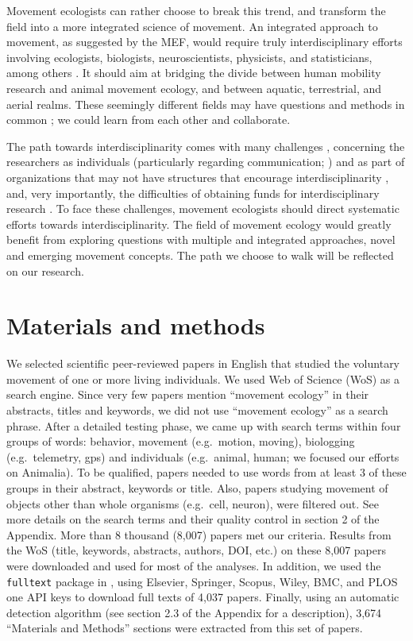 \documentclass[a4paper,12pt]{article}
\begin{document}
Movement ecologists can rather choose to break this trend, and transform
the field into a more integrated science of movement. An integrated
approach to movement, as suggested by the MEF, would require truly
interdisciplinary efforts involving ecologists, biologists,
neuroscientists, physicists, and statisticians, among others \cite{Holyoak2008,Williams2020}.
It should aim at bridging the divide between human mobility research and
animal movement ecology, and between aquatic, terrestrial, and aerial
realms. These seemingly different fields may have questions and methods
in common \cite{Lowerre2019,Thums2018,Miller2019}; we could learn from each other and collaborate.

The path towards interdisciplinarity comes with many challenges \cite{Frodeman2017,Weingart2000}, concerning the researchers as individuals (particularly regarding
communication; \cite{Bracken2006,Marzano2006}) and as part of organizations that may not
have structures that encourage interdisciplinarity \cite{Brewer1999}, and, very
importantly, the difficulties of obtaining funds for interdisciplinary
research \cite{Bromham2016}. To face these challenges, movement ecologists should
direct systematic efforts towards interdisciplinarity. The field of
movement ecology would greatly benefit from exploring questions with
multiple and integrated approaches, novel and emerging movement
concepts. The path we choose to walk will be reflected on our research.

\section*{Materials and methods}

We selected scientific peer-reviewed papers in English that studied the
voluntary movement of one or more living individuals. We used Web of
Science (WoS) as a search engine. Since very few papers mention
``movement ecology'' in their abstracts, titles and keywords, we did not
use ``movement ecology'' as a search phrase. After a detailed testing
phase, we came up with search terms within four groups of words:
behavior, movement (e.g.~motion, moving), biologging (e.g.~telemetry,
gps) and individuals (e.g.~animal, human; we focused our efforts on
Animalia). To be qualified, papers needed to use words from at least 3
of these groups in their abstract, keywords or title. Also, papers
studying movement of objects other than whole organisms (e.g.~cell,
neuron), were filtered out. See more details on the search terms and
their quality control in section 2 of the Appendix. More than 8 thousand
(8,007) papers met our criteria. Results from the WoS (title, keywords,
abstracts, authors, DOI, etc.) on these 8,007 papers were downloaded and
used for most of the analyses. In addition, we used the
\texttt{fulltext} package \cite{Rfulltext} in \cite{R2018}, using Elsevier, Springer,
Scopus, Wiley, BMC, and PLOS one API keys to download full texts of
4,037 papers. Finally, using an automatic detection algorithm (see
section 2.3 of the Appendix for a description), 3,674 ``Materials and
Methods'' sections were extracted from this set of papers.
\end{document}

